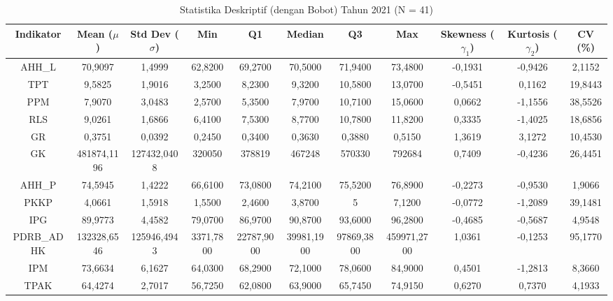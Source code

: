 \begin{table}[H]
\centering
\caption{Statistika Deskriptif (dengan Bobot) Tahun 2021 (N = 41)} \label{tab:app1desc_2021}
\begin{adjustbox}{max width=\textwidth, max height=0.85\textheight}
\begin{tabular}{|c|c|c|c|c|c|c|c|c|c|c|}
\hline
\textbf{Indikator} & \textbf{Mean ($\mu$)} & \textbf{Std Dev ($\sigma$)} & \textbf{Min} & \textbf{Q1} & \textbf{Median} & \textbf{Q3} & \textbf{Max} & \textbf{Skewness ($\gamma_1$)} & \textbf{Kurtosis ($\gamma_2$)} & \textbf{CV (\%)} \\
\hline
AHH\_L & 70,9097 & 1,4999 & 62,8200 & 69,2700 & 70,5000 & 71,9400 & 73,4800 & -0,1931 & -0,9426 & 2,1152 \\
TPT & 9,5825 & 1,9016 & 3,2500 & 8,2300 & 9,3200 & 10,5800 & 13,0700 & -0,5451 & 0,1162 & 19,8443 \\
PPM & 7,9070 & 3,0483 & 2,5700 & 5,3500 & 7,9700 & 10,7100 & 15,0600 & 0,0662 & -1,1556 & 38,5526 \\
RLS & 9,0261 & 1,6866 & 6,4100 & 7,5300 & 8,7700 & 10,7800 & 11,8200 & 0,3335 & -1,4025 & 18,6856 \\
GR & 0,3751 & 0,0392 & 0,2450 & 0,3400 & 0,3630 & 0,3880 & 0,5150 & 1,3619 & 3,1272 & 10,4530 \\
GK & 481874,1196 & 127432,0408 & 320050 & 378819 & 467248 & 570330 & 792684 & 0,7409 & -0,4236 & 26,4451 \\
AHH\_P & 74,5945 & 1,4222 & 66,6100 & 73,0800 & 74,2100 & 75,5200 & 76,8900 & -0,2273 & -0,9530 & 1,9066 \\
PKKP & 4,0661 & 1,5918 & 1,5500 & 2,4600 & 3,8700 & 5 & 7,1200 & -0,0772 & -1,2089 & 39,1481 \\
IPG & 89,9773 & 4,4582 & 79,0700 & 86,9700 & 90,8700 & 93,6000 & 96,2800 & -0,4685 & -0,5687 & 4,9548 \\
PDRB\_ADHK & 132328,6546 & 125946,4943 & 3371,7800 & 22787,9000 & 39981,1900 & 97869,3800 & 459971,2700 & 1,0361 & -0,1253 & 95,1770 \\
IPM & 73,6634 & 6,1627 & 64,0300 & 68,2900 & 72,1000 & 78,0600 & 84,9000 & 0,4501 & -1,2813 & 8,3660 \\
TPAK & 64,4274 & 2,7017 & 56,7250 & 62,0800 & 63,9000 & 65,7450 & 74,9150 & 0,6270 & 0,7370 & 4,1933 \\
\hline
\end{tabular}
\end{adjustbox}
\end{table}